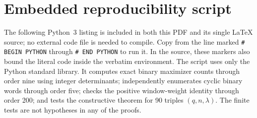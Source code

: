 \documentclass[11pt]{article}
\begin{document}
\appendix
\section{Embedded reproducibility script}
The following Python~3 listing is included in both this PDF and
its single \LaTeX{} source; no external code file is needed to
compile. Copy from the line marked \verb|# BEGIN PYTHON| through
\verb|# END PYTHON| to run it. In the source, these markers also
bound the literal code inside the verbatim environment. The
script uses only the Python standard library. It computes exact
binary maximizer counts through order nine using integer
determinants; independently enumerates cyclic binary words
through order five; checks the positive window-weight identity
through order 200; and tests the constructive theorem for 90
triples \((q,n,\lambda)\). The finite tests are not hypotheses
in any of the proofs.
\end{document}
